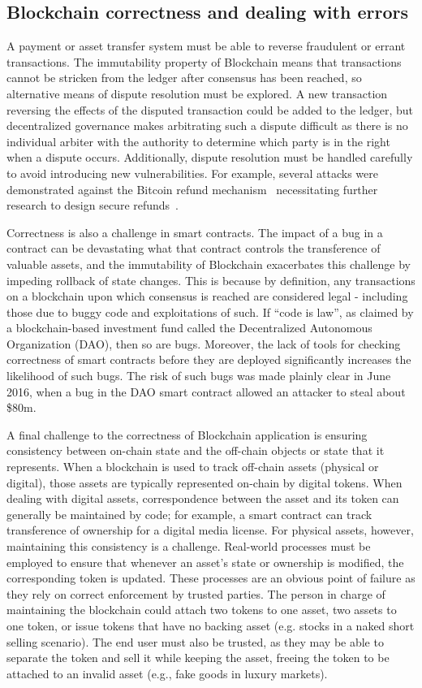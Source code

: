 \subsection{Blockchain correctness and dealing with errors}
A payment or asset transfer system must be able to reverse fraudulent or errant transactions. The immutability property of Blockchain means that transactions cannot be stricken from the ledger after consensus has been reached, so alternative means of dispute resolution must be explored. A new transaction reversing the effects of the disputed transaction could be added to the ledger, but decentralized governance makes arbitrating such a dispute difficult as there is no individual arbiter with the authority to determine which party is in the right when a dispute occurs.  Additionally, dispute resolution must be handled carefully to avoid introducing new vulnerabilities.  For example, several attacks were demonstrated against the Bitcoin refund mechanism~\cite{FC:MccShaHao16} necessitating further research to design secure refunds~\cite{arxiv:AviSafSha18}.

Correctness is also a challenge in smart contracts. The impact of a bug in a contract can be devastating what that contract controls the transference of valuable assets, and the immutability of Blockchain exacerbates this challenge by impeding rollback of state changes. This is because by definition, any transactions on a blockchain upon which consensus is reached are considered legal - including those due to buggy code and exploitations of such. If ``code is law'', as claimed by a blockchain-based investment fund called the Decentralized Autonomous Organization (DAO), then so are bugs.  Moreover, the lack of tools for checking correctness of smart contracts before they are deployed significantly increases the likelihood of such bugs.  The risk of such bugs was made plainly clear in June 2016, when a bug in the DAO smart contract allowed an attacker to steal about \$80m.

A final challenge to the correctness of Blockchain application is ensuring consistency between on-chain state and the off-chain objects or state that it represents.  When a blockchain is used to track off-chain assets (physical or digital), those assets are typically represented on-chain by digital tokens. When dealing with digital assets, correspondence between the asset and its token can generally be maintained by code; for example, a smart contract can track transference of ownership for a digital media license. For physical assets, however, maintaining this consistency is a challenge. Real-world processes must be employed to ensure that whenever an asset's state or ownership is modified, the corresponding token is updated. These processes are an obvious point of failure as they rely on correct enforcement by trusted parties. The person in charge of maintaining the blockchain could attach two tokens to one asset, two assets to one token, or issue tokens that have no backing asset (e.g. stocks in a naked short selling scenario). The end user must also be trusted, as they may be able to separate the token and sell it while keeping the asset, freeing the token to be attached to an invalid asset (e.g., fake goods in luxury markets).

